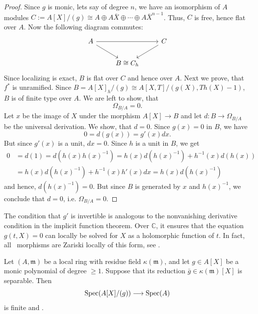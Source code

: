 \begin{proof}
	Since $g$ is monic, lets say of degree $n$, we have an isomorphism of $A$ modules $C:= A[X]/(g) \cong A \oplus A\bar{X} \oplus \cdots \oplus A\bar{X}^{n-1}$. Thus, $C$ is free, hence flat over $A$. Now the following diagram commutes:
	\[\begin{tikzcd}
		A && C \\
		& {B\cong C_h}
		\arrow[from=1-1, to=1-3]
		\arrow[from=1-1, to=2-2]
		\arrow[from=1-3, to=2-2]
	\end{tikzcd}\]
	Since localizing is exact, $B$ is flat over $C$ and hence over $A$.
	Next we prove, that $f^*$ is unramified. Since $B =A[X]_h/(g) \cong A[X, T]/(g(X), Th(X)-1)$, $B$ is of finite type over $A$. 
	We are left to show, that 
	\[
	\Omega_{B/A} = 0.
	\]
	Let $x$ be the image of $X$ under the morphism $A[X] \to B$ and let $d: B\to \Omega_{B/A}$ be the universal derivation. We show, that $d = 0$.
	Since $g(x) = 0$ in $B$, we have 
	\[
	0 = d(g(x)) = g'(x) dx.
	\]
	But since $g'(x)$ is a unit, $dx = 0$.  Since $h$ is a unit in $B$, we get 
	\begin{align*}
		0 &= d(1) = d(h(x) h(x)^{-1}) = h(x) d(h(x)^{-1})  + h^{-1}(x)d(h(x)) \\
		&= h(x) d(h(x)^{-1}) + h^{-1}(x) h'(x) dx = h(x) d(h(x)^{-1}) 
	\end{align*}
	and hence, $d(h(x)^{-1}) = 0$. But since $B$ is generated by $x$ and $h(x)^{-1}$, we conclude that $d = 0$, i.e. $\Omega_{B/A} = 0$.
\end{proof}

\begin{remark}
	The condition that $g'$ is invertible is analogous to the
	nonvanishing derivative condition in the implicit function theorem.
	Over $\mathbb{C}$, it ensures that the equation $g(t,X)=0$
	can locally be solved for $X$ as a holomorphic function of $t$.
	In fact, all \etale\ morphisms are Zariski locally of this form, see \cite[Tag 02GT]{stacks-project}.
\end{remark}

\begin{corollary}\label{cor:etale-polynomial-local-ring}
	Let $(A, \mathfrak{m})$ be a local ring with residue
	field $\kappa(\mathfrak{m})$, and let
	$g\in A[X]$ be a monic polynomial of degree $\geq 1$.
	Suppose that its reduction $\bar{g}\in\kappa(\mathfrak{m})[X]$
	is separable. Then
	\[
	\operatorname{Spec}\!\left(A[X]/(g)\right)\longrightarrow\operatorname{Spec}\!\left(A\right)
	\]
	is finite and \etale.
\end{corollary}

